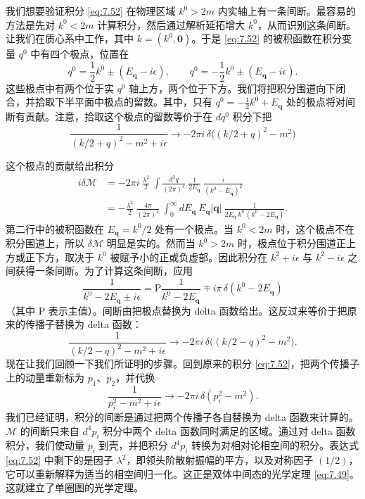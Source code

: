 我们想要验证积分 \eqref{eq:7.52} 在物理区域 $k^0 > 2m$ 内实轴上有一条间断。最容易的方法是先对 $k^0 < 2m$ 计算积分，然后通过解析延拓增大 $k^0$，从而识别这条间断。让我们在质心系中工作，其中 $k = (k^0, \mathbf{0})$。于是 \eqref{eq:7.52} 的被积函数在积分变量 $q^0$ 中有四个极点，位置在
\begin{equation}
  q^0 = \frac{1}{2}k^0 \pm (E_{\mathbf{q}} - i\epsilon),
  \qquad
  q^0 = -\frac{1}{2}k^0 \pm (E_{\mathbf{q}} - i\epsilon) .
\end{equation}
这些极点中有两个位于实 $q^0$ 轴上方，两个位于下方。我们将把积分围道向下闭合，并拾取下半平面中极点的留数。其中，只有 $q^0 = -\tfrac{1}{2}k^0 + E_{\mathbf{q}}$ 处的极点将对间断有贡献。注意，拾取这个极点的留数等价于在 $dq^0$ 积分下把
\begin{equation}
  \frac{1}{(k/2+q)^2-m^2+i\epsilon}
    \to -2\pi i\,\delta\bigl( (k/2+q)^2 - m^2 \bigr)
  \label{eq:7.53}
\end{equation}

这个极点的贡献给出积分
\begin{equation}
  \begin{aligned}
    i\delta\mathcal{M} &= -2\pi i\ \frac{\lambda^2}{2}\ \int
      \frac{d^3q}{(2\pi)^4}\ \frac{1}{2E_{\mathbf{q}}}\
      \frac{i}{(k^0-E_{\mathbf{q}})^2}\\
    &= -\frac{\lambda^2}{2}\ \frac{4\pi}{(2\pi)^4}\ \int_0^{\infty}
      dE_{\mathbf{q}}\ E_{\mathbf{q}}|\mathbf{q}|\ \frac{1}{2E_{\mathbf{q}}\,k^0\,
        (k^0-2E_{\mathbf{q}})} .
  \end{aligned}
  \label{eq:7.54}
\end{equation}
第二行中的被积函数在 $E_{\mathbf{q}} = k^0/2$ 处有一个极点。当 $k^0 < 2m$ 时，这个极点不在积分围道上，所以 $\delta\mathcal{M}$ 明显是实的。然而当 $k^0 > 2m$ 时，极点位于积分围道正上方或正下方，取决于 $k^0$ 被赋予小的正或负虚部。因此积分在 $k^2 + i\epsilon$ 与 $k^2 - i\epsilon$ 之间获得一条间断。为了计算这条间断，应用
\begin{equation}
  \frac{1}{k^0 - 2E_{\mathbf{q}} \pm i\epsilon}
  = \mathrm{P}\frac{1}{k^0 - 2E_{\mathbf{q}}}
    \mp i\pi\,\delta(k^0 - 2E_{\mathbf{q}})
\end{equation}
（其中 P 表示主值）。间断由把极点替换为 delta 函数给出。这反过来等价于把原来的传播子替换为 delta 函数：
\begin{equation}
  \frac{1}{(k/2-q)^2-m^2+i\epsilon}
    \to -2\pi i\,\delta\bigl( (k/2-q)^2 - m^2 \bigr) .
  \label{eq:7.55}
\end{equation}
现在让我们回顾一下我们所证明的步骤。回到原来的积分 \eqref{eq:7.52}，把两个传播子上的动量重新标为 $p_1$、$p_2$，并代换
\begin{equation}
  \frac{1}{p_i^2 - m^2 + i\epsilon}
    \to -2\pi i\,\delta(p_i^2 - m^2) .
  \label{eq:7.56}
\end{equation}
我们已经证明，积分的间断是通过把两个传播子各自替换为 delta 函数来计算的。$\mathcal{M}$ 的间断只来自 $d^4p_i$ 积分中两个 delta 函数同时满足的区域。通过对 delta 函数积分，我们使动量 $p_i$ 到壳，并把积分 $d^4p_i$ 转换为对相对论相空间的积分。表达式 \eqref{eq:7.52} 中剩下的是因子 $\lambda^2$，即领头阶散射振幅的平方，以及对称因子 $(1/2)$，它可以重新解释为适当的相空间归一化。这正是双体中间态的光学定理 \eqref{eq:7.49}。这就建立了单圈图的光学定理。

